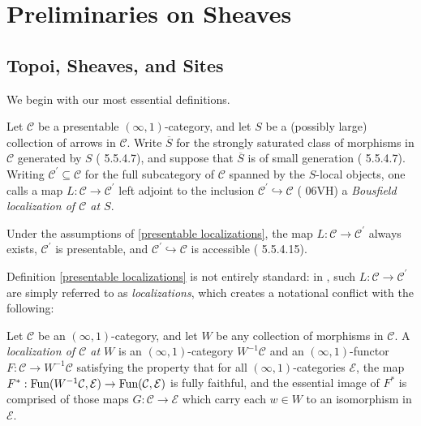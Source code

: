 \documentclass[10pt]{article}
\newcommand{\C}{\mathcal C}
\newcommand{\cE}{\mathcal{E}}
\theoremstyle{witharg}
\theoremstyle{witharg}
\theoremstyle{witharg2}
\begin{document}
\section{Preliminaries on Sheaves}

\subsection{Topoi, Sheaves, and Sites}

\noindent We begin with our most essential definitions. 


\begin{definition}{}\label{presentable localizations}

    Let $\C$ be a presentable $(\infty,1)$-category, and let $S$ be a (possibly large) collection of arrows in $\C$. Write $\overline{S}$ for the strongly saturated class of morphisms in $\C$ generated by $S$ ( 5.5.4.7), and suppose that $\overline{S}$ is of small generation ( 5.5.4.7). Writing $\C^\prime\subseteq \C$ for the full subcategory of $\C$ spanned by the $S$-local objects, one calls a map $L:\C\rightarrow \C^\prime$ left adjoint to the inclusion $\C^\prime\hookrightarrow \C$ ( 06VH) a \emph{Bousfield localization of $\C$ at $S$}.
    
\end{definition}

\begin{remark}{}

    Under the assumptions of \ref{presentable localizations}, the map $L:\C\rightarrow \C^\prime$ always exists, $\C^\prime$ is presentable, and $\C^\prime\hookrightarrow \C$ is accessible ( 5.5.4.15).
    
\end{remark}

\noindent Definition \ref{presentable localizations} is not entirely standard: in , such $L:\C\rightarrow \C^\prime$ are simply referred to as \emph{localizations}, which creates a notational conflict with the following: 


\begin{definition}{}\label{Regular localizations definition}

    Let $\C$ be an $(\infty,1)$-category, and let $W$ be any collection of morphisms in $\C$. A \emph{localization of $\C$ at $W$} is an $(\infty,1)$-category $W^{-1}\C$ and an $(\infty,1)$-functor $F:\C\rightarrow W^{-1}\C$ satisfying the property that for all $(\infty,1)$-categories $\cE$, the map $F^*:\textnormal{Fun}(W^{-1}\C,\cE)\rightarrow \textnormal{Fun}(\C,\cE)$ is fully faithful, and the essential image of $F^*$ is comprised of those maps $G:\C\rightarrow \cE$ which carry each $w\in W$ to an isomorphism in $\cE$. 
    
\end{definition}
\end{document}
